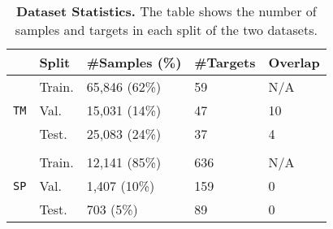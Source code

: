 \begin{table}[h]
    \centering
    \caption{\textbf{Dataset Statistics.} The table shows the number of samples and targets in each split of the two datasets.}
    \vspace{5pt}
    \label{tab:data}
    \begin{tabular}{lllll}
        \toprule
        & \textbf{Split} & \textbf{\#Samples} (\%) & \textbf{\#Targets} & \textbf{Overlap} \\
        \midrule
        \multirow{3}{*}{\texttt{TM}} 
        & Train. & 65,846 (62\%) & 59 & N/A \\
        & Val. & 15,031 (14\%) & 47 & 10 \\
        & Test. & 25,083 (24\%) & 37 & 4 \\
        \\
        \multirow{3}{*}{\texttt{SP}} 
        & Train. & 12,141 (85\%) & 636 & N/A \\
        & Val. & 1,407 (10\%) & 159 & 0 \\
        & Test. & 703 (5\%) & 89 & 0 \\
        \bottomrule
    \end{tabular}
\end{table}